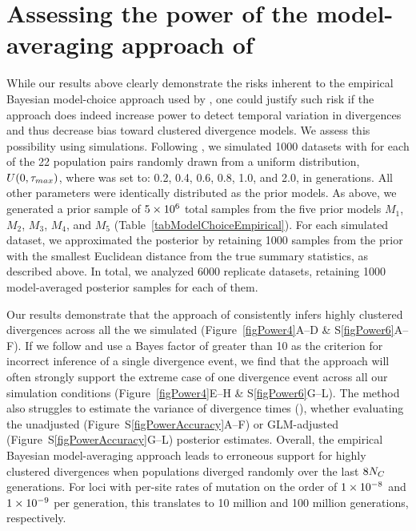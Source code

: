 \section{Assessing the power of the model-averaging approach of
    \citet{Hickerson2013}}
While our results above clearly demonstrate the risks inherent to the empirical
Bayesian model-choice approach used by \citet{Hickerson2013}, one could justify
such risk if the approach does indeed increase power to detect temporal
variation in divergences and thus decrease bias toward clustered divergence
models.
We assess this possibility using simulations.
Following \citet{Oaks2012}, we simulated 1000 datasets with \divt{} for each of
the 22 population pairs randomly drawn from a uniform distribution, $U(0,
\tau_{max})$, where  was set to: 0.2, 0.4, 0.6, 0.8, 1.0, and 2.0, in
\globalcoalunit generations.
All other parameters were identically distributed as the prior models.
As above, we generated a prior sample of $5\times 10^{6}$ total samples from the five
prior models $M_1$, $M_2$, $M_3$, $M_4$, and $M_5$
(Table~\ref{tabModelChoiceEmpirical}).
For each simulated dataset, we approximated the posterior
by retaining 1000 samples from the prior with the smallest Euclidean distance
from the true summary statistics, as described above.
In total, we analyzed 6000 replicate datasets, retaining 1000 model-averaged
posterior samples for each of them.

Our results demonstrate that the approach of \citet{Hickerson2013} consistently
infers highly clustered divergences across all the  we simulated
(Figure~\ref{figPower4}A--D \& S\ref{figPower6}A--F).
If we follow \citet{Hickerson2013} and use a Bayes factor of greater than 10 as
the criterion for incorrect inference of a single divergence event, we find
that the approach will often strongly support the extreme case of one
divergence event across all our simulation conditions (Figure~\ref{figPower4}E--H \&
S\ref{figPower6}G--L).
The method also struggles to estimate the variance of divergence times
(\vmratio{}), whether evaluating the unadjusted
(Figure~S\ref{figPowerAccuracy}A--F) or GLM-adjusted
(Figure~S\ref{figPowerAccuracy}G--L) posterior estimates.
Overall, the empirical Bayesian model-averaging approach leads to erroneous
support for highly clustered divergences when populations diverged randomly
over the last $8N_C$ generations.
For loci with per-site rates of mutation on the order of $1\times 10^{-8}$ and
$1\times 10^{-9}$ per generation, this translates to 10 million and 100 million
generations, respectively.


